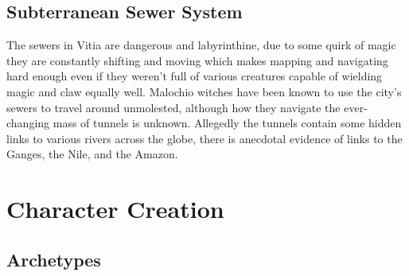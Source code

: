 \documentclass{article}
\begin{document}
\begin{multicols}{2}
\subsection{Subterranean Sewer System}
The sewers in Vitia are dangerous and labyrinthine, due to some quirk of magic they are constantly shifting and moving which makes mapping and navigating hard enough even if they weren't full of various creatures capable of wielding magic and claw equally well. Malochio witches have been known to use the city's sewers to travel around unmolested, although how they navigate the ever-changing mass of tunnels is unknown. Allegedly the tunnels contain some hidden links to various rivers across the globe, there is anecdotal evidence of links to the Ganges, the Nile, and the Amazon. 
\end{multicols}
\section{Character Creation}
\subsection{Archetypes}
\end{document}
